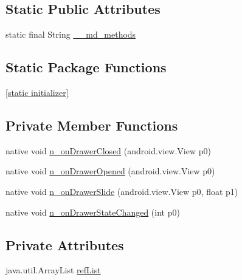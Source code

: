 \subsection*{Static Public Attributes}
\begin{CompactItemize}
\item 
static final String \hyperlink{classmd5270abb39e60627f0f200893b490a1ade_1_1_navigation_page_renderer___drawer_multiplexed_listener_fbd57ba6663a7c518799ec5668b08d40}{\_\-\_\-md\_\-methods}
\end{CompactItemize}
\subsection*{Static Package Functions}
\begin{CompactItemize}
\item 
\hyperlink{classmd5270abb39e60627f0f200893b490a1ade_1_1_navigation_page_renderer___drawer_multiplexed_listener_f7621ecbbf92717f0baa7bc40c2d6e98}{\mbox{[}static initializer\mbox{]}}
\end{CompactItemize}
\subsection*{Private Member Functions}
\begin{CompactItemize}
\item 
native void \hyperlink{classmd5270abb39e60627f0f200893b490a1ade_1_1_navigation_page_renderer___drawer_multiplexed_listener_8d093d39d461e62b0a6ae6193975efd2}{n\_\-onDrawerClosed} (android.view.View p0)
\item 
native void \hyperlink{classmd5270abb39e60627f0f200893b490a1ade_1_1_navigation_page_renderer___drawer_multiplexed_listener_ba83be49c7eae728eb6aa07ae6d151b1}{n\_\-onDrawerOpened} (android.view.View p0)
\item 
native void \hyperlink{classmd5270abb39e60627f0f200893b490a1ade_1_1_navigation_page_renderer___drawer_multiplexed_listener_833ecd6b482341746f5d469f9f080a8d}{n\_\-onDrawerSlide} (android.view.View p0, float p1)
\item 
native void \hyperlink{classmd5270abb39e60627f0f200893b490a1ade_1_1_navigation_page_renderer___drawer_multiplexed_listener_40394df52dc0b52b8560926e06cdc137}{n\_\-onDrawerStateChanged} (int p0)
\end{CompactItemize}
\subsection*{Private Attributes}
\begin{CompactItemize}
\item 
java.util.ArrayList \hyperlink{classmd5270abb39e60627f0f200893b490a1ade_1_1_navigation_page_renderer___drawer_multiplexed_listener_8022e4f9043b76f8c63dff3406a8d039}{refList}
\end{CompactItemize}


